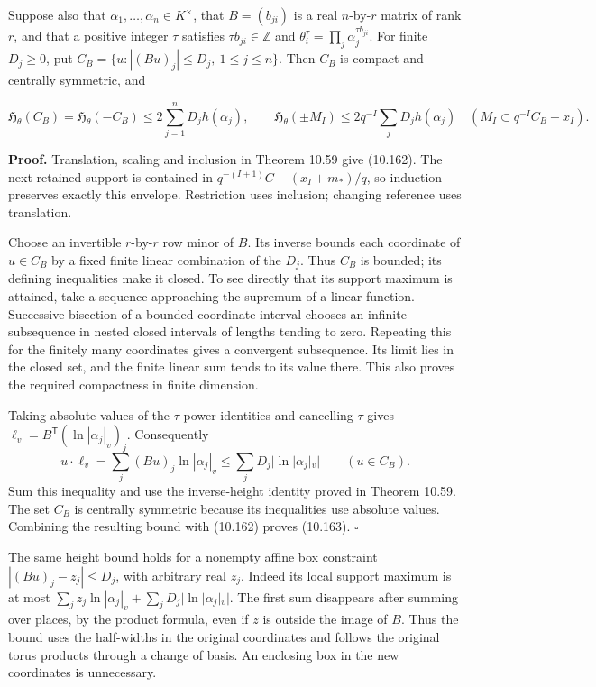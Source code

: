 \documentclass[
  11pt,
  a4paper,
]{article}
\newcounter{none} %
\begin{document}
Suppose also that \(\alpha_1,\ldots,\alpha_n\in K^\times\), that
\(B=(b_{ji})\) is a real \(n\)-by-\(r\) matrix of rank \(r\), and that a
positive integer \(\tau\) satisfies \(\tau b_{ji}\in\mathbb Z\) and
\(\theta_i^\tau=\prod_j\alpha_j^{\tau b_{ji}}\). For finite \(D_j\ge0\),
put \(C_B=\{u: |(Bu)_j|\le D_j,\ 1\le j\le n\}\). Then \(C_B\) is
compact and centrally symmetric, and

\[
\mathfrak H_\theta(C_B)=\mathfrak H_\theta(-C_B)
\le2\sum_{j=1}^nD_j h(\alpha_j),\qquad
\mathfrak H_\theta(\pm M_I)
\le2q^{-I}\sum_jD_jh(\alpha_j)
\quad(M_I\subset q^{-I}C_B-x_I).
\tag{10.163}
\]

\textbf{Proof.} Translation, scaling and inclusion in Theorem 10.59 give
(10.162). The next retained support is contained in
\(q^{-(I+1)}C-(x_I+m_*)/q\), so induction preserves exactly this
envelope. Restriction uses inclusion; changing reference uses
translation.

Choose an invertible \(r\)-by-\(r\) row minor of \(B\). Its inverse
bounds each coordinate of \(u\in C_B\) by a fixed finite linear
combination of the \(D_j\). Thus \(C_B\) is bounded; its defining
inequalities make it closed. To see directly that its support maximum is
attained, take a sequence approaching the supremum of a linear function.
Successive bisection of a bounded coordinate interval chooses an
infinite subsequence in nested closed intervals of lengths tending to
zero. Repeating this for the finitely many coordinates gives a
convergent subsequence. Its limit lies in the closed set, and the finite
linear sum tends to its value there. This also proves the required
compactness in finite dimension.

Taking absolute values of the \(\tau\)-power identities and cancelling
\(\tau\) gives \(\ell_v=B^{\mathsf T}(\ln|\alpha_j|_v)_j\). Consequently
\[
u\cdot\ell_v=\sum_j(Bu)_j\ln|\alpha_j|_v
\le\sum_jD_j|\ln|\alpha_j|_v|
\qquad(u\in C_B).
\] Sum this inequality and use the inverse-height identity proved in
Theorem 10.59. The set \(C_B\) is centrally symmetric because its
inequalities use absolute values. Combining the resulting bound with
(10.162) proves (10.163). \(\square\)

The same height bound holds for a nonempty affine box constraint
\(|(Bu)_j-z_j|\le D_j\), with arbitrary real \(z_j\). Indeed its local
support maximum is at most
\(\sum_j z_j\ln|\alpha_j|_v+\sum_jD_j|\ln|\alpha_j|_v|\). The first sum
disappears after summing over places, by the product formula, even if
\(z\) is outside the image of \(B\). Thus the bound uses the half-widths
in the original coordinates and follows the original torus products
through a change of basis. An enclosing box in the new coordinates is
unnecessary.
\end{document}
